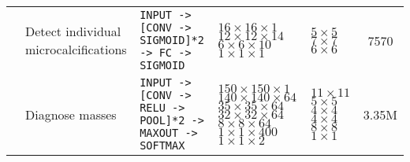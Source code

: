 \begin{landscape}
\begin{longtable}{cp{3.4cm}p{7cm}p{2.7cm}p{1.3cm}c}
	\cite{Ge2006}& Detect individual microcalcifications & \texttt{INPUT -> [CONV -> SIGMOID]*2 -> FC -> SIGMOID} & $16\times 16 \times 1$ \newline $12 \times 12 \times 14$\newline $6\times 6 \times 10$\newline $1 \times 1 \times 1$ & $5 \times 5$\newline $7 \times 7$ \newline $6 \times 6$& 7570 \\
	\cite{Arevalo2015}& Diagnose masses & \texttt{INPUT -> [CONV -> RELU -> POOL]*2 -> MAXOUT -> SOFTMAX} & $150\times 150 \times 1$ \newline $140 \times 140 \times 64$\newline $35\times 35 \times 64$\newline $32 \times 32 \times 64$ \newline $8 \times 8 \times 64$ \newline $1 \times 1 \times 400$ \newline $1 \times 1 \times 2$ & $11 \times 11$ \newline $5 \times 5$ \newline $4 \times 4$ \newline $4 \times 4$ \newline $8 \times 8$ \newline $1 \times 1$ & 3.35M \\

\end{longtable}
\end{landscape}
